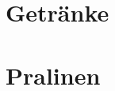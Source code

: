 \documentclass[ngerman,12pt,parskip=half]{scrbook}
\begin{document}
\clearpage

\chapter{Getränke}

\clearpage

\chapter{Pralinen}

\clearpage

	
\end{document}
